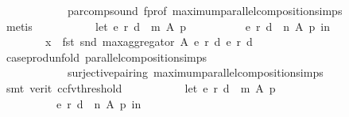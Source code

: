 \begin{isabellebody}
\ \ \ \ \ \ \ \ \ \ \ \ par{\isacharunderscore}{\kern0pt}comp{\isacharunderscore}{\kern0pt}sound\ f{\isacharunderscore}{\kern0pt}prof\ maximum{\isacharunderscore}{\kern0pt}parallel{\isacharunderscore}{\kern0pt}composition{\isachardot}{\kern0pt}simps\isanewline
\ \ \ \ \ \ \isamarkupfalse%
\ metis\isanewline
\ \ \ \ \isamarkupfalse%
\isanewline
\ \ \ \ \ \ {\isachardoublequoteopen}let\ {\isacharparenleft}{\kern0pt}e{}{\isacharcomma}{\kern0pt}\ r{}{\isacharcomma}{\kern0pt}\ d{}{\isacharparenright}{\kern0pt}\ {\isacharequal}{\kern0pt}\ m\ A\ p{\isacharsemicolon}{\kern0pt}\isanewline
\ \ \ \ \ \ \ \ \ \ {\isacharparenleft}{\kern0pt}e{}{\isacharcomma}{\kern0pt}\ r{}{\isacharcomma}{\kern0pt}\ d{}{\isacharparenright}{\kern0pt}\ {\isacharequal}{\kern0pt}\ n\ A\ p\ in\isanewline
\ \ \ \ \ \ \ \ x\ {\isasymin}\ fst\ {\isacharparenleft}{\kern0pt}snd\ {\isacharparenleft}{\kern0pt}max{\isacharunderscore}{\kern0pt}aggregator\ A\ {\isacharparenleft}{\kern0pt}e{}{\isacharcomma}{\kern0pt}\ r{}{\isacharcomma}{\kern0pt}\ d{}{\isacharparenright}{\kern0pt}\ {\isacharparenleft}{\kern0pt}e{}{\isacharcomma}{\kern0pt}\ r{}{\isacharcomma}{\kern0pt}\ d{}{\isacharparenright}{\kern0pt}{\isacharparenright}{\kern0pt}{\isacharparenright}{\kern0pt}{\isachardoublequoteclose}\isanewline
\ \ \ \ \ \ \isamarkupfalse%
\ case{\isacharunderscore}{\kern0pt}prod{\isacharunderscore}{\kern0pt}unfold\ parallel{\isacharunderscore}{\kern0pt}composition{\isachardot}{\kern0pt}simps\isanewline
\ \ \ \ \ \ \ \ \ \ \ \ surjective{\isacharunderscore}{\kern0pt}pairing\ maximum{\isacharunderscore}{\kern0pt}parallel{\isacharunderscore}{\kern0pt}composition{\isachardot}{\kern0pt}simps\isanewline
\ \ \ \ \ \ \isamarkupfalse%
\ {\isacharparenleft}{\kern0pt}smt\ {\isacharparenleft}{\kern0pt}verit{\isacharcomma}{\kern0pt}\ ccfv{\isacharunderscore}{\kern0pt}threshold{\isacharparenright}{\kern0pt}{\isacharparenright}{\kern0pt}\isanewline
\ \ \ \ \isamarkupfalse%
\isanewline
\ \ \ \ \ \ {\isachardoublequoteopen}let\ {\isacharparenleft}{\kern0pt}e{}{\isacharcomma}{\kern0pt}\ r{}{\isacharcomma}{\kern0pt}\ d{}{\isacharparenright}{\kern0pt}\ {\isacharequal}{\kern0pt}\ m\ A\ p{\isacharsemicolon}{\kern0pt}\isanewline
\ \ \ \ \ \ \ \ \ \ {\isacharparenleft}{\kern0pt}e{}{\isacharcomma}{\kern0pt}\ r{}{\isacharcomma}{\kern0pt}\ d{}{\isacharparenright}{\kern0pt}\ {\isacharequal}{\kern0pt}\ n\ A\ p\ in\isanewline

\end{isabellebody}
